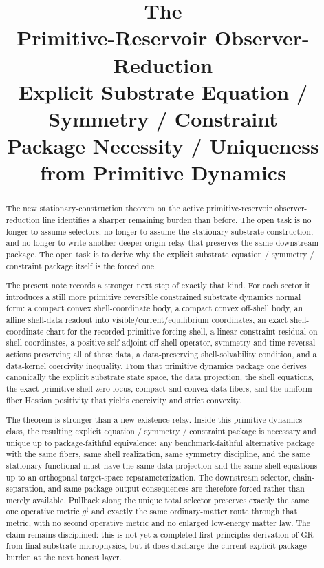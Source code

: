 \documentclass[11pt]{article}
\title{\textbf{The \TheoryName{}}\\[0.4em]
\large Primitive-Reservoir Observer-Reduction\\
\large Explicit Substrate Equation / Symmetry / Constraint\\
\large Package Necessity / Uniqueness from Primitive Dynamics}
\author{}
\date{}
\newcommand{\CompletedMetric}{g^{\sharp}}
\begin{document}
\maketitle

\begin{abstract}
The new stationary-construction theorem on the active primitive-reservoir observer-reduction line identifies a sharper remaining burden than before. The open task is no longer to assume selectors, no longer to assume the stationary substrate construction, and no longer to write another deeper-origin relay that preserves the same downstream package. The open task is to derive why the explicit substrate equation / symmetry / constraint package itself is the forced one.

The present note records a stronger next step of exactly that kind. For each sector it introduces a still more primitive reversible constrained substrate dynamics normal form: a compact convex shell-coordinate body, a compact convex off-shell body, an affine shell-data readout into visible/current/equilibrium coordinates, an exact shell-coordinate chart for the recorded primitive forcing shell, a linear constraint residual on shell coordinates, a positive self-adjoint off-shell operator, symmetry and time-reversal actions preserving all of those data, a data-preserving shell-solvability condition, and a data-kernel coercivity inequality. From that primitive dynamics package one derives canonically the explicit substrate state space, the data projection, the shell equations, the exact primitive-shell zero locus, compact and convex data fibers, and the uniform fiber Hessian positivity that yields coercivity and strict convexity.

The theorem is stronger than a new existence relay. Inside this primitive-dynamics class, the resulting explicit equation / symmetry / constraint package is necessary and unique up to package-faithful equivalence: any benchmark-faithful alternative package with the same fibers, same shell realization, same symmetry discipline, and the same stationary functional must have the same data projection and the same shell equations up to an orthogonal target-space reparameterization. The downstream selector, chain-separation, and same-package output consequences are therefore forced rather than merely available. Pullback along the unique total selector preserves exactly the same one operative metric \(\CompletedMetric\) and exactly the same ordinary-matter route through that metric, with no second operative metric and no enlarged low-energy matter law. The claim remains disciplined: this is not yet a completed first-principles derivation of GR from final substrate microphysics, but it does discharge the current explicit-package burden at the next honest layer.
\end{abstract}
\end{document}
